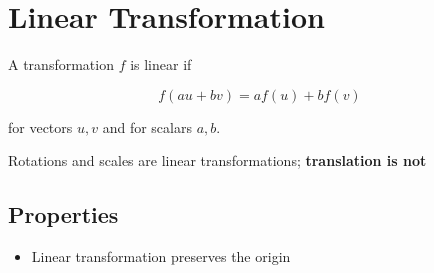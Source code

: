 \section{Linear Transformation}

A transformation $ f $ is linear if

\begin{equation}
  f\left( au + bv \right) = a f\left( u \right) + b f\left( v \right)
\end{equation}

for vectors $ u, v $ and for scalars $ a, b $.

Rotations and scales are linear transformations; \textbf{translation is not}

\subsection{Properties}

  \begin{itemize}
    \item Linear transformation preserves the origin
  \end{itemize}
